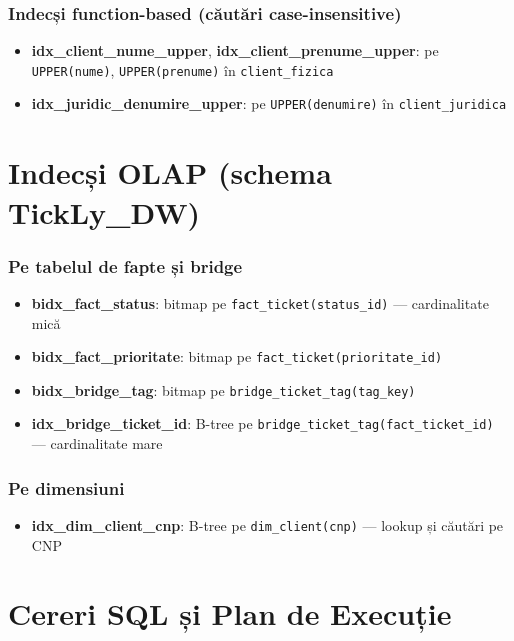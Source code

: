 \subsubsection{Indecși function-based (căutări case-insensitive)}

\begin{itemize}
    \item \textbf{idx\_client\_nume\_upper}, \textbf{idx\_client\_prenume\_upper}: pe \texttt{UPPER(nume)}, \texttt{UPPER(prenume)} în \texttt{client\_fizica}
    \item \textbf{idx\_juridic\_denumire\_upper}: pe \texttt{UPPER(denumire)} în \texttt{client\_juridica}
\end{itemize}

\section{Indecși OLAP (schema TickLy\_DW)}

\subsubsection{Pe tabelul de fapte și bridge}

\begin{itemize}
    \item \textbf{bidx\_fact\_status}: bitmap pe \texttt{fact\_ticket(status\_id)} — cardinalitate mică
    \item \textbf{bidx\_fact\_prioritate}: bitmap pe \texttt{fact\_ticket(prioritate\_id)}
    \item \textbf{bidx\_bridge\_tag}: bitmap pe \texttt{bridge\_ticket\_tag(tag\_key)}
    \item \textbf{idx\_bridge\_ticket\_id}: B-tree pe \texttt{bridge\_ticket\_tag(fact\_ticket\_id)} — cardinalitate mare
\end{itemize}

\subsubsection{Pe dimensiuni}

\begin{itemize}
    \item \textbf{idx\_dim\_client\_cnp}: B-tree pe \texttt{dim\_client(cnp)} — lookup și căutări pe CNP
\end{itemize}

\section{Cereri SQL și Plan de Execuție}

